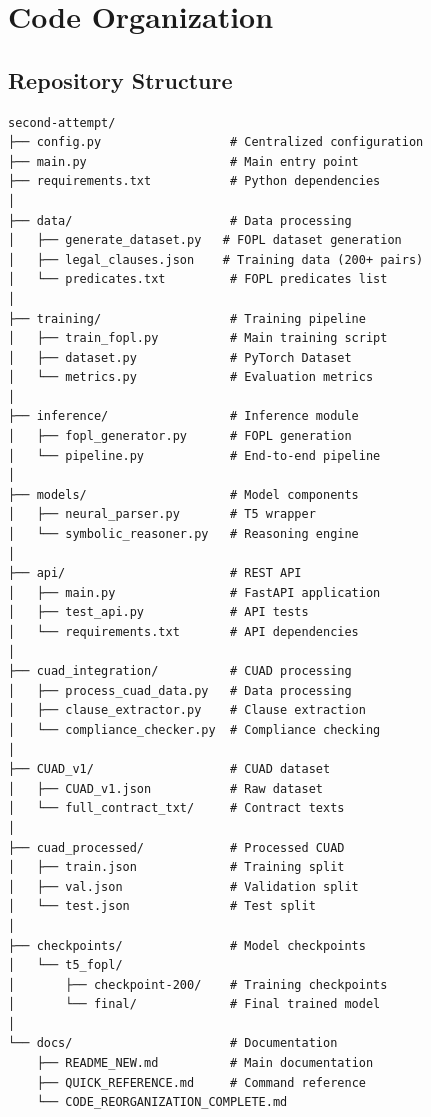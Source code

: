 \documentclass[12pt,a4paper]{article}
\begin{document}
\newpage

\section{Code Organization}

\subsection{Repository Structure}

\begin{verbatim}
second-attempt/
├── config.py                  # Centralized configuration
├── main.py                    # Main entry point
├── requirements.txt           # Python dependencies
│
├── data/                      # Data processing
│   ├── generate_dataset.py   # FOPL dataset generation
│   ├── legal_clauses.json    # Training data (200+ pairs)
│   └── predicates.txt         # FOPL predicates list
│
├── training/                  # Training pipeline
│   ├── train_fopl.py          # Main training script
│   ├── dataset.py             # PyTorch Dataset
│   └── metrics.py             # Evaluation metrics
│
├── inference/                 # Inference module
│   ├── fopl_generator.py      # FOPL generation
│   └── pipeline.py            # End-to-end pipeline
│
├── models/                    # Model components
│   ├── neural_parser.py       # T5 wrapper
│   └── symbolic_reasoner.py   # Reasoning engine
│
├── api/                       # REST API
│   ├── main.py                # FastAPI application
│   ├── test_api.py            # API tests
│   └── requirements.txt       # API dependencies
│
├── cuad_integration/          # CUAD processing
│   ├── process_cuad_data.py   # Data processing
│   ├── clause_extractor.py    # Clause extraction
│   └── compliance_checker.py  # Compliance checking
│
├── CUAD_v1/                   # CUAD dataset
│   ├── CUAD_v1.json           # Raw dataset
│   └── full_contract_txt/     # Contract texts
│
├── cuad_processed/            # Processed CUAD
│   ├── train.json             # Training split
│   ├── val.json               # Validation split
│   └── test.json              # Test split
│
├── checkpoints/               # Model checkpoints
│   └── t5_fopl/
│       ├── checkpoint-200/    # Training checkpoints
│       └── final/             # Final trained model
│
└── docs/                      # Documentation
    ├── README_NEW.md          # Main documentation
    ├── QUICK_REFERENCE.md     # Command reference
    └── CODE_REORGANIZATION_COMPLETE.md
\end{verbatim}
\end{document}
